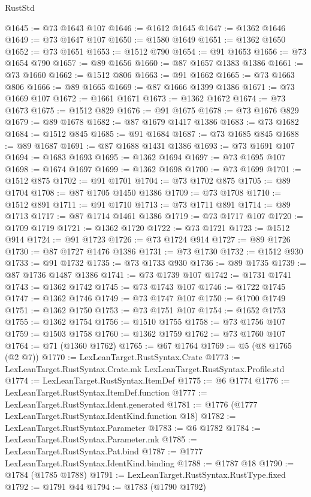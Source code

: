 \begin{lexlean}{RustStd}
\begin{coremodule}
{\begin{coremodule}
{{{{{@1645 := @73 @1643 @107
@1646 := @1612 @1645
@1647 := @1362 @1646
@1649 := @73 @1647 @107
@1650 := @1580 @1649
@1651 := @1362 @1650
@1652 := @73 @1651
@1653 := @1512 @790
@1654 := @91 @1653
@1656 := @73 @1654 @790
@1657 := @89 @1656
@1660 := @87 @1657 @1383 @1386
@1661 := @73 @1660
@1662 := @1512 @806
@1663 := @91 @1662
@1665 := @73 @1663 @806
@1666 := @89 @1665
@1669 := @87 @1666 @1399 @1386
@1671 := @73 @1669 @107
@1672 := @1661 @1671
@1673 := @1362 @1672
@1674 := @73 @1673
@1675 := @1512 @829
@1676 := @91 @1675
@1678 := @73 @1676 @829
@1679 := @89 @1678
@1682 := @87 @1679 @1417 @1386
@1683 := @73 @1682
@1684 := @1512 @845
@1685 := @91 @1684
@1687 := @73 @1685 @845
@1688 := @89 @1687
@1691 := @87 @1688 @1431 @1386
@1693 := @73 @1691 @107
@1694 := @1683 @1693
@1695 := @1362 @1694
@1697 := @73 @1695 @107
@1698 := @1674 @1697
@1699 := @1362 @1698
@1700 := @73 @1699
@1701 := @1512 @875
@1702 := @91 @1701
@1704 := @73 @1702 @875
@1705 := @89 @1704
@1708 := @87 @1705 @1450 @1386
@1709 := @73 @1708
@1710 := @1512 @891
@1711 := @91 @1710
@1713 := @73 @1711 @891
@1714 := @89 @1713
@1717 := @87 @1714 @1461 @1386
@1719 := @73 @1717 @107
@1720 := @1709 @1719
@1721 := @1362 @1720
@1722 := @73 @1721
@1723 := @1512 @914
@1724 := @91 @1723
@1726 := @73 @1724 @914
@1727 := @89 @1726
@1730 := @87 @1727 @1476 @1386
@1731 := @73 @1730
@1732 := @1512 @930
@1733 := @91 @1732
@1735 := @73 @1733 @930
@1736 := @89 @1735
@1739 := @87 @1736 @1487 @1386
@1741 := @73 @1739 @107
@1742 := @1731 @1741
@1743 := @1362 @1742
@1745 := @73 @1743 @107
@1746 := @1722 @1745
@1747 := @1362 @1746
@1749 := @73 @1747 @107
@1750 := @1700 @1749
@1751 := @1362 @1750
@1753 := @73 @1751 @107
@1754 := @1652 @1753
@1755 := @1362 @1754
@1756 := @1510 @1755
@1758 := @73 @1756 @107
@1759 := @1503 @1758
@1760 := @1362 @1759
@1762 := @73 @1760 @107
@1764 := @71 (@1360 @1762)
@1765 := @67 @1764
@1769 := @5 (@8 @1765 (@2 @7))
@1770 := LexLeanTarget.RustSyntax.Crate
@1773 := LexLeanTarget.RustSyntax.Crate.mk LexLeanTarget.RustSyntax.Profile.std
@1774 := LexLeanTarget.RustSyntax.ItemDef
@1775 := @6 @1774
@1776 := LexLeanTarget.RustSyntax.ItemDef.function
@1777 := LexLeanTarget.RustSyntax.Ident.generated
@1781 := @1776 (@1777 LexLeanTarget.RustSyntax.IdentKind.function @18)
@1782 := LexLeanTarget.RustSyntax.Parameter
@1783 := @6 @1782
@1784 := LexLeanTarget.RustSyntax.Parameter.mk
@1785 := LexLeanTarget.RustSyntax.Pat.bind
@1787 := @1777 LexLeanTarget.RustSyntax.IdentKind.binding
@1788 := @1787 @18
@1790 := @1784 (@1785 @1788)
@1791 := LexLeanTarget.RustSyntax.RustType.fixed
@1792 := @1791 @44
@1794 := @1783 (@1790 @1792)
}}}}}
\end{coremodule}}
\end{coremodule}
\end{lexlean}
